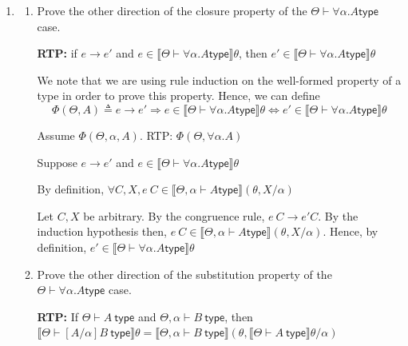\documentclass[10pt,\jkfside,a4paper]{article}
\newcommand{\answer}[1]{
    \begin{tcolorbox}[colframe=black, colback=white, sharp corners, boxrule=0.2mm, breakable]
        #1
    \end{tcolorbox}
}
\begin{document}
\begin{enumerate}
\begin{enumerate}
        \answer{ 
            $\forall \alpha. \alpha \to (X \to \alpha \to \alpha \to \alpha) \to \alpha$
        }

    \end{enumerate}

    \item
    \begin{enumerate} 
        \item
        Prove the other direction of the closure property of the $\Theta \vdash \forall \alpha. A \mathsf{type}$ case. 

        \answer{ 
            \textbf{RTP:} if $e \to e'$ and $e \in \llbracket \Theta \vdash \forall \alpha . A \mathsf{type} \rrbracket \theta$, then $e' \in \llbracket \Theta \vdash \forall \alpha . A \mathsf{type} \rrbracket \theta$

            We note that we are using rule induction on the well-formed property of a type in order to prove this property. Hence, we can define 
            \[ 
                \Phi(\Theta, A) \triangleq e \to e' \Rightarrow e \in \llbracket \Theta \vdash \forall \alpha . A \mathsf{type} \rrbracket \theta \Leftrightarrow e' \in \llbracket \Theta \vdash \forall \alpha . A \mathsf{type} \rrbracket \theta
            \]

            Assume $\Phi(\Theta, \alpha, A)$. RTP: $\Phi(\Theta, \forall \alpha. A)$

            Suppose $e \to e'$ and $e \in \llbracket \Theta \vdash \forall \alpha . A \mathsf{type} \rrbracket \theta$

            By definition, $\forall C, X, e\ C \in \llbracket \Theta, \alpha \vdash A \mathsf{type} \rrbracket (\theta, X / \alpha)$

            Let $C, X$ be arbitrary. By the congruence rule, $e \ C \rightarrow e' C$. By the induction hypothesis then, $e\ C \in \llbracket \Theta, \alpha \vdash A \mathsf{type} \rrbracket (\theta, X / \alpha)$. Hence, by definition,  $e' \in \llbracket \Theta \vdash \forall \alpha . A \mathsf{type} \rrbracket \theta$
        }

        \item
        Prove the other direction of the substitution property of the $\Theta \vdash \forall \alpha. A \mathsf{type}$ case. 

        \answer{ 
            \textbf{RTP:} If $\Theta \vdash A\ \mathsf{type}$ and $\Theta, \alpha \vdash B\ \mathsf{type}$, then $\llbracket \Theta \vdash [A / \alpha] B\ \mathsf{type}\rrbracket \theta = \llbracket \Theta, \alpha \vdash B\ \mathsf{type} \rrbracket (\theta, \llbracket \Theta \vdash A \ \mathsf{type} \rrbracket \theta / \alpha)$

}
\end{enumerate}
\end{enumerate}
\end{document}
